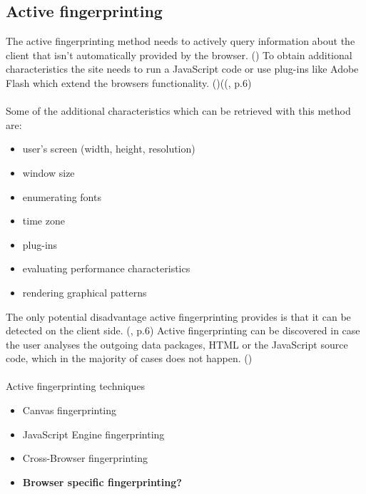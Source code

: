 \subsection{Active fingerprinting}
The active fingerprinting method needs to actively query information about the client that isn't automatically provided by the browser. (\textcite{web17}) To obtain additional characteristics the site needs to run a JavaScript code or use plug-ins like Adobe Flash which extend the browsers functionality. (\textcite{web17})((\textcite{doty18}, p.6)\\\\
Some of the additional characteristics which can be retrieved with this method are:
\begin{itemize}
	\item user's screen (width, height, resolution)
	\item window size
	\item enumerating fonts
	\item time zone
	\item plug-ins
	\item evaluating performance characteristics
	\item rendering graphical patterns\\
\end{itemize}
The only potential disadvantage active fingerprinting provides is that it can be detected on the client side. (\textcite{doty18}, p.6) Active fingerprinting can be discovered in case the user analyses the outgoing data packages, HTML or the JavaScript source code, which in the majority of cases does not happen. (\textcite{web17})\\\\
Active fingerprinting techniques
\begin{itemize}
	\item Canvas fingerprinting
	\item JavaScript Engine fingerprinting
	\item Cross-Browser fingerprinting
	\item \textbf{Browser specific fingerprinting?}
\end{itemize}

